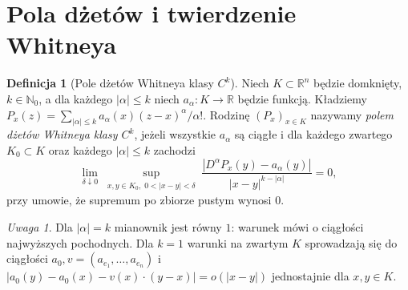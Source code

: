 \documentclass[11pt,a4paper,oneside]{book}
\numberwithin{equation}{chapter}
\theoremstyle{plain}
\theoremstyle{definition}
\newtheorem{definicja}[twierdzenie]{Definicja}
\theoremstyle{remark}
\newtheorem{uwaga}[twierdzenie]{Uwaga}
\begin{document}
\section{Pola dżetów i twierdzenie Whitneya}
\begin{definicja}[Pole dżetów Whitneya klasy $C^k$]
\label{def:dzety-whitney-field}
Niech $K\subset\mathbb R^n$ będzie domknięty,
$k\in\mathbb N_0$, a dla każdego $|\alpha|\le k$
niech $a_\alpha:K\to\mathbb R$ będzie funkcją.
Kładziemy $P_x(z)=\sum_{|\alpha|\le k}
 a_\alpha(x)(z-x)^\alpha/\alpha!$.
Rodzinę $(P_x)_{x\in K}$ nazywamy
\emph{polem dżetów Whitneya klasy $C^k$}, jeżeli
wszystkie $a_\alpha$ są ciągłe i dla każdego zwartego
$K_0\subset K$ oraz każdego $|\alpha|\le k$ zachodzi
\[
 \lim_{\delta\downarrow0}
 \sup_{\substack{x,y\in K_0,\;0<|x-y|<\delta}}
 \frac{|D^\alpha P_x(y)-a_\alpha(y)|}
 {|x-y|^{k-|\alpha|}}=0,
\]
przy umowie, że supremum po zbiorze pustym wynosi $0$.
\end{definicja}

\begin{uwaga}
Dla $|\alpha|=k$ mianownik jest równy $1$:
warunek mówi o ciągłości najwyższych pochodnych.
Dla $k=1$ warunki na zwartym $K$ sprowadzają się do
ciągłości $a_0,v=(a_{e_1},\ldots,a_{e_n})$ i
$|a_0(y)-a_0(x)-v(x)\cdot(y-x)|=o(|x-y|)$
jednostajnie dla $x,y\in K$.
\end{uwaga}
\end{document}
